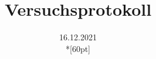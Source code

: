 \documentclass[a4paper,12pt,titlepage]{scrartcl}
\begin{document}
\titlehead
{
    \small
    {
        Technische Universität Ilmenau\\
        Fakulät IA\\
        Institut für Biomedizinische Technik und Informatik\\

        Praktikum Deep Learning in der Biomedizintechnik\\
        WS 2021/22}
}

\title {Versuchsprotokoll}
\author{}
\date{16.12.2021\\*[60pt]}
\maketitle

\pagestyle{fancy}
\newpage
\end{document}

